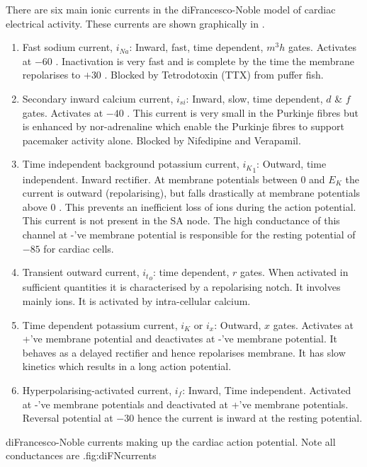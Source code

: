 There are six main ionic currents in the diFrancesco-Noble model of cardiac
electrical activity. These currents are shown graphically in
.
\begin{enumerate}
\item Fast sodium current, $i_{Na}$: Inward, fast, time dependent, $m^{3}h$
  gates.  Activates at $-60$ \mV. Inactivation is very fast and is complete by
  the time the membrane repolarises to $+30$ \mV. Blocked by Tetrodotoxin (TTX)
  from puffer fish.
\item Secondary inward calcium current, $i_{si}$: Inward, slow, time
  dependent, $d$ \& $f$ gates. Activates at $-40$ \mV. This current is very
  small in the Purkinje fibres but is enhanced by nor-adrenaline which enable
  the Purkinje fibres to support pacemaker activity alone. Blocked by
  Nifedipine and Verapamil.
\item Time independent background potassium current, ${i_{K}}_{1}$: Outward,
  time independent. Inward rectifier. At membrane potentials
  between $0$ and $E_{K}$ the current is outward (repolarising), but
  falls drastically at membrane potentials above $0$ \mV. This prevents an
  inefficient loss of  ions during the action potential. This
  current is not present in the SA node. The high conductance of this channel
  at -'ve membrane potential is responsible for the resting potential of 
  $-85$ \mV for cardiac cells.
\item Transient outward current, ${i_{t}}_{o}$: time dependent, $r$ gates.
  When activated in sufficient quantities it is characterised by a
  repolarising notch. It involves mainly  ions. It is activated by
  intra-cellular calcium.
\item Time dependent potassium current, $i_{K}$ or $i_{x}$: Outward, $x$
  gates. Activates at +'ve membrane potential and deactivates at -'ve
  membrane potential. It behaves as a delayed rectifier and hence repolarises
  membrane. It has slow kinetics which results in a long action potential.
\item Hyperpolarising-activated current, $i_{f}$: Inward, Time
  independent. Activated at -'ve membrane potentials and deactivated at +'ve
  membrane potentials. Reversal potential at $-30$ \mV hence the current is
  inward at the resting potential.
\end{enumerate}

{diFrancesco-Noble currents making up the cardiac action potential. Note all
  conductances are .}{fig:diFNcurrents}

